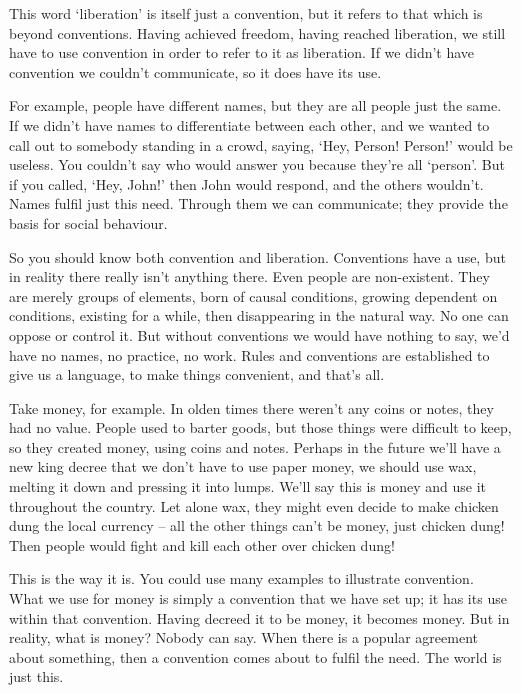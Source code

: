 This word `liberation' is itself just a convention, but it refers to that which is beyond conventions. Having achieved freedom, having reached liberation, we still have to use convention in order to refer to it as liberation. If we didn't have convention we couldn't communicate, so it does have its use.

For example, people have different names, but they are all people just the same. If we didn't have names to differentiate between each other, and we wanted to call out to somebody standing in a crowd, saying, `Hey, Person! Person!' would be useless. You couldn't say who would answer you because they're all `person'. But if you called, `Hey, John!' then John would respond, and the others wouldn't. Names fulfil just this need. Through them we can communicate; they provide the basis for social behaviour.

So you should know both convention and liberation. Conventions have a use, but in reality there really isn't anything there. Even people are non-existent. They are merely groups of elements, born of causal conditions, growing dependent on conditions, existing for a while, then disappearing in the natural way. No one can oppose or control it. But without conventions we would have nothing to say, we'd have no names, no practice, no work. Rules and conventions are established to give us a language, to make things convenient, and that's all.

Take money, for example. In olden times there weren't any coins or notes, they had no value. People used to barter goods, but those things were difficult to keep, so they created money, using coins and notes. Perhaps in the future we'll have a new king decree that we don't have to use paper money, we should use wax, melting it down and pressing it into lumps. We'll say this is money and use it throughout the country. Let alone wax, they might even decide to make chicken dung the local currency -- all the other things can't be money, just chicken dung! Then people would fight and kill each other over chicken dung!

This is the way it is. You could use many examples to illustrate convention. What we use for money is simply a convention that we have set up; it has its use within that convention. Having decreed it to be money, it becomes money. But in reality, what is money? Nobody can say. When there is a popular agreement about something, then a convention comes about to fulfil the need. The world is just this.

